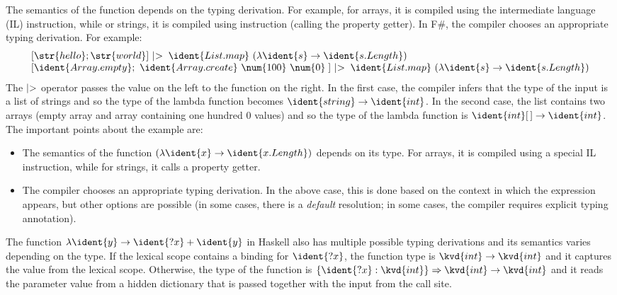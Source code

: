 The semantics of the function depends on the typing derivation. For example, for arrays, it is
compiled using the  intermediate language (IL) instruction, while or strings, it is
compiled using  instruction (calling the property getter). In F\#, the compiler chooses
an appropriate typing derivation. For example:
%
\begin{equation*}
\begin{array}{l}
  \lbrack \str{hello};\str{world} \rbrack ~|\hspace{-0.25em}>\;\ident{List.map}~(\lambda\ident{s}\rightarrow\ident{s.Length})\\
  \lbrack \ident{Array.empty};~\ident{Array.create}~\num{100}~\num{0}\; \rbrack ~|\hspace{-0.25em}>\;\ident{List.map}~(\lambda\ident{s}\rightarrow\ident{s.Length})\\
\end{array}
\end{equation*}
%
The $|\hspace{-0.25em}>$ operator passes the value on the left to the function on the right. In
the first case, the compiler infers that the type of the input is a list of strings and so the
type of the lambda function becomes $\ident{string}\rightarrow\ident{int}$. In the second case,
the list contains two arrays (empty array and array containing one hundred 0 values) and so
the type of the lambda function is $\ident{int}\lbrack\,\rbrack\rightarrow\ident{int}$.
The important points about the example are:
%
\begin{itemize}
\item The semantics of the function $(\lambda\ident{x}\rightarrow\ident{x.Length})$
  depends on its type. For arrays, it is compiled using a special IL instruction, while for
  strings, it calls a property getter.

\item The compiler chooses an appropriate typing derivation. In the above case, this is done
  based on the context in which the expression appears, but other options are possible
  (in some cases, there is a \emph{default} resolution; in some cases, the compiler requires
  explicit typing annotation).
\end{itemize}
%
The function $\lambda\ident{y}\rightarrow\ident{?x}+\ident{y}$ in Haskell also has multiple
possible typing derivations and its semantics varies depending on the type. If the lexical
scope contains a binding for $\ident{?x}$, the function type is $\kvd{int}\rightarrow\kvd{int}$
and it captures the value from the lexical scope. Otherwise, the type of the function is
$\{\ident{?x}:\kvd{int}\}\Rightarrow\kvd{int}\rightarrow\kvd{int}$ and it reads the parameter
value from a hidden dictionary that is passed together with the input from the call site.

